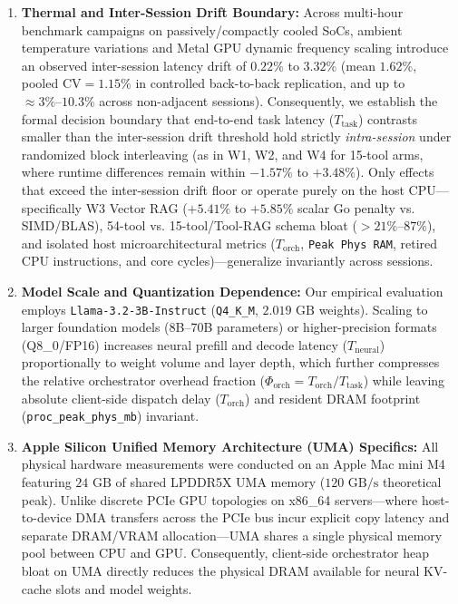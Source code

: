 \documentclass[preprint,12pt,3p]{elsarticle}
\begin{document}
\begin{enumerate}
    \item \textbf{Thermal and Inter-Session Drift Boundary:} Across multi-hour benchmark campaigns on passively/compactly cooled SoCs, ambient temperature variations and Metal GPU dynamic frequency scaling introduce an observed inter-session latency drift of $0.22\%$ to $3.32\%$ (mean $1.62\%$, pooled $\text{CV} = 1.15\%$ in controlled back-to-back replication, and up to $\approx 3\%\text{--}10.3\%$ across non-adjacent sessions). Consequently, we establish the formal decision boundary that end-to-end task latency ($T_{\text{task}}$) contrasts smaller than the inter-session drift threshold hold strictly \textit{intra-session} under randomized block interleaving (as in W1, W2, and W4 for 15-tool arms, where runtime differences remain within $-1.57\%$ to $+3.48\%$). Only effects that exceed the inter-session drift floor or operate purely on the host CPU---specifically W3 Vector RAG ($+5.41\%$ to $+5.85\%$ scalar Go penalty vs. SIMD/BLAS), 54-tool vs. 15-tool/Tool-RAG schema bloat ($>21\%\text{--}87\%$), and isolated host microarchitectural metrics ($T_{\text{orch}}$, \texttt{Peak Phys RAM}, retired CPU instructions, and core cycles)---generalize invariantly across sessions.
    \item \textbf{Model Scale and Quantization Dependence:} Our empirical evaluation employs \texttt{Llama-3.2-3B-Instruct} (\texttt{Q4\_K\_M}, $2.019\text{ GB}$ weights). Scaling to larger foundation models (8B--70B parameters) or higher-precision formats (Q8\_0/FP16) increases neural prefill and decode latency ($T_{\text{neural}}$) proportionally to weight volume and layer depth, which further compresses the relative orchestrator overhead fraction ($\Phi_{\text{orch}} = T_{\text{orch}} / T_{\text{task}}$) while leaving absolute client-side dispatch delay ($T_{\text{orch}}$) and resident DRAM footprint (\texttt{proc\_peak\_phys\_mb}) invariant.
    \item \textbf{Apple Silicon Unified Memory Architecture (UMA) Specifics:} All physical hardware measurements were conducted on an Apple Mac mini M4 featuring $24\text{ GB}$ of shared LPDDR5X UMA memory ($120\text{ GB/s}$ theoretical peak). Unlike discrete PCIe GPU topologies on x86\_64 servers---where host-to-device DMA transfers across the PCIe bus incur explicit copy latency and separate DRAM/VRAM allocation---UMA shares a single physical memory pool between CPU and GPU. Consequently, client-side orchestrator heap bloat on UMA directly reduces the physical DRAM available for neural KV-cache slots and model weights.

\end{enumerate}
\end{document}
